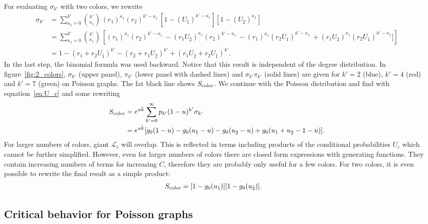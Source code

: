 \documentclass[aps, pre, onecolumn, a4paper, floatfix]{revtex4}
\begin{document}
For evaluating $\sigma_{k'}$ with two colors, we rewrite 
\begin{align}
\sigma_{k'} &= \sum_{\kappa_1=0}^{k'} {k' \choose \kappa_1}\, 
(r_1)^{\kappa_1} (r_2)^{k'-\kappa_1}\,
[1-(U_{\bar 1})^{k'-\kappa_1 }] [1-(U_{\bar 2})^{\kappa_1 }]\\
&= \sum_{\kappa_1=0}^{k'} {k' \choose \kappa_1}\, 
\left[
(r_1)^{\kappa_1} (r_2)^{k'-\kappa_1}\, - 
(r_1 U_{\bar 2})^{\kappa_1} (r_2)^{k'-\kappa_1}\,-
(r_1)^{\kappa_1} (r_2 U_{\bar 1})^{k'-\kappa_1}\,+
(r_1 U_{\bar 2})^{\kappa_1} (r_2 U_{\bar 1})^{k'-\kappa_1}]
\right]\\
 &= 1 - (r_1+r_2 U_{\bar 1})^{k'} - (r_2+r_1 U_{\bar 2})^{k'} + (r_1 U_{\bar 2} + r_2 U_{\bar 1})^{k'}.
\end{align}
In the last step, the binomial formula was used backward. 
Notice that this result is independent of the degree distribution. 
In figure~\ref{fig:2_colors}, $\sigma_{k'}$ (upper panel), 
$\pi_{k'}$ (lower panel with dashed lines) and $\sigma_{k'}\pi_{k'}$ (solid lines)
are given for $k'=2$ (blue), $k'=4$ (red) and $k'=7$ (green) on Poisson graphs. 
The fat black line shows $S_{\rm color}$. 
We continue with the Poisson distribution and find with equation~\ref{eq:U_c} and some rewriting 
\begin{align}
S_{\rm color} &= e^{u \bar{k}} \sum_{k'=0}^{\infty} p_{k'} (1-u)^{k'}\sigma_{k'}\\
 &= e^{u \bar{k}} [g_0(1-u) - g_0(u_{\bar 1} -u) - 
g_0(u_{\bar 2} -u) + g_0(u_{\bar 1} + u_{\bar 2} -1-u)].
\end{align}
For larger numbers of colors, giant $\mathcal{L}_{\bar c}$ will overlap. 
This is reflected in terms including products of the conditional probabilities $U_{\bar c}$ 
which cannot be further simplified. 
However, even for larger numbers of colors 
there are closed form expressions with generating functions. 
They contain increasing numbers of terms for increasing $C$, 
therefore they are probably only useful for a few colors. 
For two colors, it is even possible to rewrite the final result as a simple product: 
\begin{align}
S_{\rm color} &= [1-g_0(u_{\bar 1})] [1-g_0(u_{\bar 2})].\label{eq:2_colors}
\end{align}



\subsection{Critical behavior for Poisson graphs}
\end{document}
